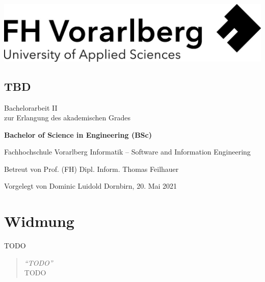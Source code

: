 \documentclass[a4paper,12pt,twoside]{scrreprt}
\begin{document}
\onehalfspacing %

\cleardoublepage %
\thispagestyle{empty}
\begin{titlepage}
    \begin{flushright}
    \includegraphics[width=0.4\linewidth]{images/Logo_FHV.jpg}
    \end{flushright}
    \begin{flushleft}
    \section*{TBD}
    \vspace{1cm}

    Bachelorarbeit II\\
    zur Erlangung des akademischen Grades
    \vspace{0.5cm}

    \textbf{Bachelor of Science in Engineering (BSc)}

    \vspace{1cm}
    Fachhochschule Vorarlberg\newline
    Informatik – Software and Information Engineering

    \vspace{0.5cm}

    Betreut von\newline
    Prof. (FH) Dipl. Inform. Thomas Feilhauer

    \vspace{0.5cm}

    Vorgelegt von\newline
    Dominic Luidold\newline
    Dornbirn, 20. Mai 2021
    \end{flushleft}
\end{titlepage}

\newpage
\section*{Widmung}
\label{sec:widmung}
TODO

\bigskip

\begin{quote}
    \begin{flushright}
        \textit{\enquote{TODO}}\\
        TODO
    \end{flushright}
\end{quote}
\end{document}
